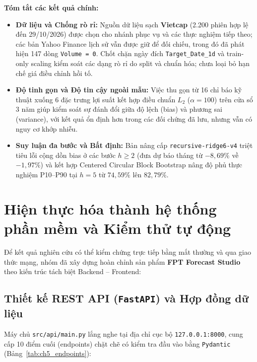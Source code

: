 \documentclass[12pt,a4paper]{report}
\begin{document}
\textbf{Tóm tắt các kết quả chính:}
\begin{itemize}
    \item \textbf{Dữ liệu và Chống rò rỉ:} Nguồn dữ liệu sạch \textbf{Vietcap} (2.200 phiên hợp lệ đến 29/10/2026) được chọn cho nhánh phục vụ và các thực nghiệm tiếp theo; các bản Yahoo Finance lịch sử vẫn được giữ để đối chiếu, trong đó đã phát hiện 147 dòng \texttt{Volume = 0}. Chốt chặn ngày đích \nolinkurl{Target_Date_1d} và train-only scaling kiểm soát các dạng rò rỉ do split và chuẩn hóa; chưa loại bỏ hạn chế giá điều chỉnh hồi tố.
    \item \textbf{Độ tinh gọn và Độ tin cậy ngoài mẫu:} Việc thu gọn từ 16 chỉ báo kỹ thuật xuống 6 đặc trưng lợi suất kết hợp điều chuẩn $L_2$ ($\alpha = 100$) trên cửa sổ 3 năm giúp kiểm soát sự đánh đổi giữa độ lệch (bias) và phương sai (variance), với kết quả ổn định hơn trong các đối chứng đã lưu, nhưng vẫn có nguy cơ khớp nhiễu.
    \item \textbf{Suy luận đa bước và Bất định:} Bản nâng cấp \nolinkurl{recursive-ridge6-v4} triệt tiêu lỗi cộng dồn bias ở các bước $h \ge 2$ (đưa dự báo tháng từ $-8,69\%$ về $-1,97\%$) và kết hợp Centered Circular Block Bootstrap nâng độ phủ thực nghiệm P10--P90 tại $h=5$ từ $74,59\%$ lên $82,79\%$.
\end{itemize}

\section{Hiện thực hóa thành hệ thống phần mềm và Kiểm thử tự động}
Để kết quả nghiên cứu có thể kiểm chứng trực tiếp bằng mắt thường và qua giao thức mạng, nhóm đã xây dựng hoàn chỉnh sản phẩm \textbf{FPT Forecast Studio} theo kiến trúc tách biệt Backend -- Frontend:

\subsection{Thiết kế REST API (\texttt{FastAPI}) và Hợp đồng dữ liệu}
Máy chủ \nolinkurl{src/api/main.py} lắng nghe tại địa chỉ cục bộ \nolinkurl{127.0.0.1:8000}, cung cấp 10 điểm cuối (endpoints) chặt chẽ có kiểm tra đầu vào bằng \texttt{Pydantic} (Bảng~\ref{tab:ch5_endpoints}):
\end{document}
